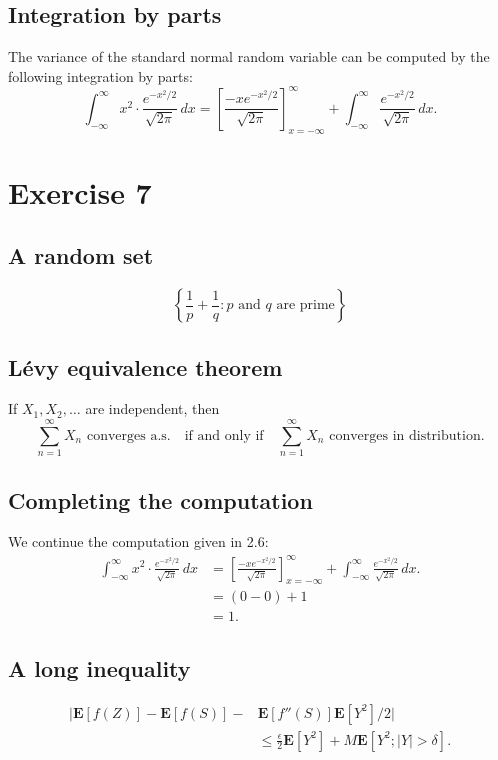 \documentclass{amsart}
\numberwithin{equation}{section}
\begin{document}
\subsection{Integration by parts}
The variance of the standard normal random variable can be computed by the
following integration by parts:
\[ \int_{-\infty}^\infty x^2 \cdot \frac{e^{-x^2/2}}{\sqrt{2\pi}}\,dx
= \left[\frac{-xe^{-x^2/2}}{\sqrt{2\pi}}\right]_{x=-\infty}^{\infty}
+ \int_{-\infty}^\infty \frac{e^{-x^2/2}}{\sqrt{2\pi}}\,dx. \]



\section{Exercise 7}

\subsection{A random set}
\[ \left\{ \frac{1}{p}+\frac{1}{q} : \text{$p$ and $q$ are prime} \right\} \]

\subsection{L\'evy equivalence theorem}
If $X_1,X_2,\ldots$ are independent, then
\[ \sum_{n=1}^\infty X_n \text{ converges a.s.}\quad
\text{if and only if}\quad \sum_{n=1}^\infty X_n
\text{ converges in distribution}.
\]

\subsection{Completing the computation}
We continue the computation given in 2.6:
\[
\begin{split}
\int_{-\infty}^\infty x^2 \cdot \frac{e^{-x^2/2}}{\sqrt{2\pi}}\,dx
&= \left[\frac{-xe^{-x^2/2}}{\sqrt{2\pi}}\right]_{x=-\infty}^{\infty}
+ \int_{-\infty}^\infty \frac{e^{-x^2/2}}{\sqrt{2\pi}}\,dx. \\
&= (0-0) + 1 \\
&= 1.
\end{split}
\]

\subsection{A long inequality}
\[
\begin{split}
|\mathbf{E}[f(Z)]-\mathbf{E}[f(S)]-&\mathbf{E}[f''(S)]\mathbf{E}[Y^2]/2| \\
&\le \frac{\epsilon}{2}\mathbf{E}[Y^2]+M\mathbf{E}[Y^2;|Y|>\delta].
\end{split}
\]
\end{document}
